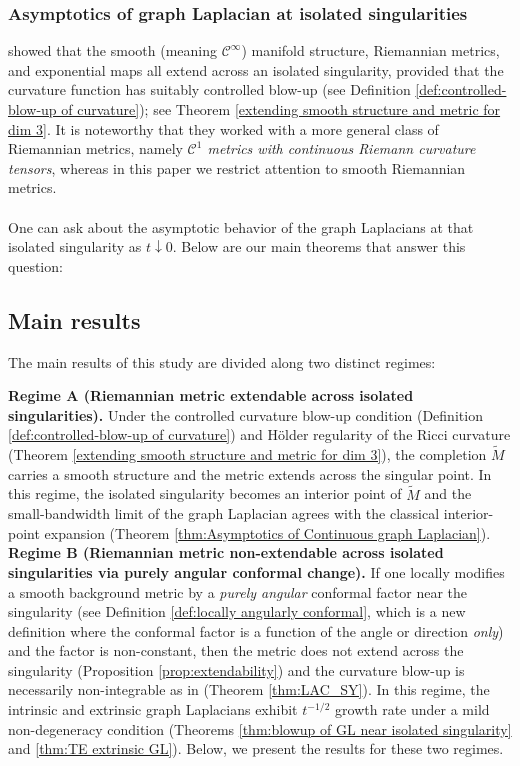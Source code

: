 \documentclass{amsart}
\let\oldcitet\citet
\renewcommand{\citet}[1]{\textcolor{blue}{\oldcitet{#1}}}
\theoremstyle{definition}
\theoremstyle{remark}
\newcommand{\nd}{\noindent}
\newcommand{\0}{\boldsymbol{0}}
\def\cC{\mathcal C}
\begin{document}
\subsubsection{\textbf{Asymptotics of graph Laplacian at isolated singularities}}

\citet{SmithYang1992} showed that the smooth (meaning $\cC^{\infty}$) manifold structure, Riemannian metrics, and exponential maps all extend across an isolated singularity, provided that the curvature function has suitably controlled blow-up (see Definition \ref{def:controlled-blow-up of curvature}); see Theorem \ref{extending smooth structure and metric for dim 3}. It is noteworthy that they worked with a more general class of Riemannian metrics, namely \textit{$\cC^1$ metrics with continuous Riemann curvature tensors}, whereas in this paper we restrict attention to smooth Riemannian metrics.\\\\

\nd One can ask about the asymptotic behavior of the graph Laplacians at that isolated singularity as $t\downarrow 0$. Below are our main theorems that answer this question:

\subsection{Main results}\label{scn:main-results}

\nd The main results of this study are divided along two distinct regimes:

\nd \textbf{Regime A (Riemannian metric extendable across isolated singularities).} Under the controlled curvature blow-up condition (Definition \ref{def:controlled-blow-up of curvature}) and Hölder regularity of the Ricci curvature (Theorem \ref{extending smooth structure and metric for dim 3}), the completion $\widetilde{M}$ carries a smooth structure and the metric extends across the singular point. In this regime, the isolated singularity becomes an interior point of $\widetilde{M}$ and the small-bandwidth limit of the graph Laplacian agrees with the classical interior-point expansion (Theorem \ref{thm:Asymptotics of Continuous graph Laplacian}).\\
\nd \textbf{Regime B (Riemannian metric non-extendable across isolated singularities via purely angular conformal change).} If one locally modifies a smooth background metric by a \textit{purely angular} conformal factor near the singularity (see Definition \ref{def:locally angularly conformal}, which is a new definition where the conformal factor is a function of the angle or direction\textit{ only}) and the factor is non-constant, then the metric does not extend across the singularity (Proposition \ref{prop:extendability}) and the curvature blow-up is necessarily non-integrable as in \citet{SmithYang1992}(Theorem \ref{thm:LAC_SY}). In this regime, the intrinsic and extrinsic graph Laplacians exhibit $t^{-1/2}$ growth rate under a mild non-degeneracy condition (Theorems  \ref{thm:blowup of GL near isolated singularity} and \ref{thm:TE extrinsic GL}). Below, we present the results for these two regimes.
\end{document}
